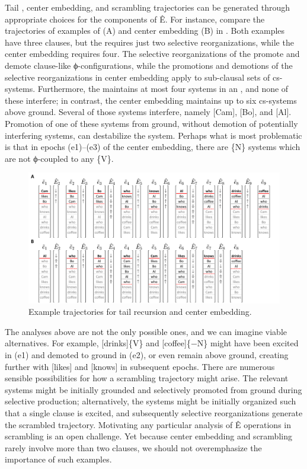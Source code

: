   Tail , center embedding, and scrambling trajectories can be generated through appropriate choices for the components of Ê. For instance, compare the trajectories of examples of  (A) and center embedding (B) in {}. Both examples have three clauses, but the  requires just two selective reorganizations, while the center embedding requires four. The selective reorganizations of the  promote and demote clause-like ϕ-con\-fig\-u\-ra\-tions, while the promotions and demotions of the selective reorganizations in center embedding apply to sub-clausal sets of cs-sys\-tems. Furthermore, the  maintains at most four systems in an , and none of these interfere; in contrast, the center embedding maintains up to six cs-sys\-tems above ground. Several of those systems interfere, namely [Cam], [Bo], and [Al]. Promotion of one of these systems from ground, without demotion of potentially interfering systems, can destabilize the system. Perhaps what is most problematic is that in epochs (e1)--(e3) of the center embedding, there are \{N\} systems which are not ϕ-coupled to any \{V\}.

  
\begin{figure}
\includegraphics[width=\textwidth]{figures/Tilsen-img119.png}
\caption{Example trajectories for tail recursion and center embedding.}
\label{fig:5:15}
\end{figure}
 
   The analyses above are not the only possible ones, and we can imagine viable alternatives. For example, [drinks]\{V\} and [coffee]\{−N\} might have been excited in (e1) and demoted to ground in (e2), or even remain above ground, creating further  with [likes] and [knows] in subsequent epochs. There are numerous sensible possibilities for how a scrambling trajectory might arise. The relevant systems might be initially grounded and selectively promoted from ground during selective production; alternatively, the systems might be initially organized such that a single clause is excited, and subsequently selective reorganizations generate the scrambled trajectory. Motivating any particular analysis of Ê operations in scrambling is an open challenge. Yet because center embedding and scrambling rarely involve more than two clauses, we should not overemphasize the importance of such examples.

